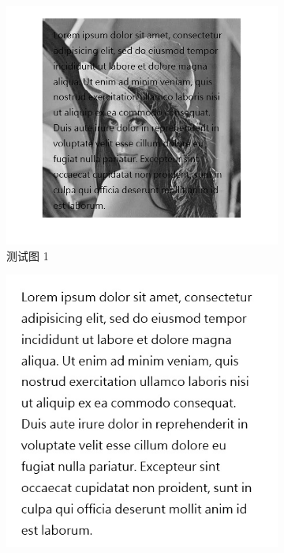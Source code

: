 \documentclass[UTF8]{ctexart}
\begin{document}
\begin{figure}[H]
    \centering
    \begin{subfigure}[b]{0.3\textwidth}
        \includegraphics[width=\textwidth]{test.png} %
        \caption{测试图 1}
        \label{fig:test1}
    \end{subfigure}
    \hfill
    \begin{subfigure}[b]{0.3\textwidth}
        \includegraphics[width=\textwidth]{mask.jpg} %

\end{subfigure}
\end{figure}
\end{document}
